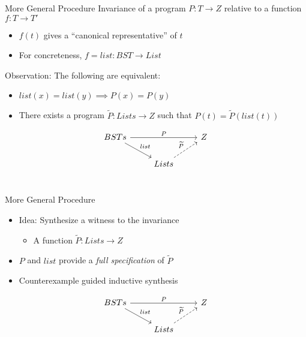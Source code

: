 \documentclass[usenames,dvipsnames]{beamer}
\begin{document}
\begin{frame}[fragile]{More General Procedure}
  Invariance of a program $P : T\to Z$
  relative to a function $f : T \to T'$
  \begin{itemize}
    \item $f(t)$ gives a ``canonical representative'' of $t$
    \item For concreteness, $f = list : BST \to List$
  \end{itemize}
  \vfill
  Observation:
  The following are equivalent:
  \begin{itemize}
    \item $list(x) = list(y) \implies P(x) = P(y)$
    \item There exists a program $\widetilde{P} : Lists\to Z$
      such that $P(t) = \widetilde{P}(list(t))$
  \end{itemize}

  \[
    \begin{tikzcd}
      BSTs \arrow{rr}{P} \arrow{rd}{list} &   & Z \\
      & Lists \arrow[dashed]{ru}{\widetilde{P}} &   \\
    \end{tikzcd}
  \]
\end{frame}

\begin{frame}[fragile]{More General Procedure}
  \begin{itemize}
    \item Idea: Synthesize a witness to the invariance
    \begin{itemize}
      \item A function $\widetilde{P} : Lists \to Z$
    \end{itemize}
    \item $P$ and $list$ provide a \emph{full specification} of $\widetilde{P}$
    \item Counterexample guided inductive synthesis \cite{solar06}
  \end{itemize}

  \[
    \begin{tikzcd}
      BSTs \arrow{rr}{P} \arrow{rd}{list} &   & Z \\
      & Lists \arrow[dashed]{ru}{\widetilde{P}} &   \\
    \end{tikzcd}
  \]
\end{frame}
\end{document}

